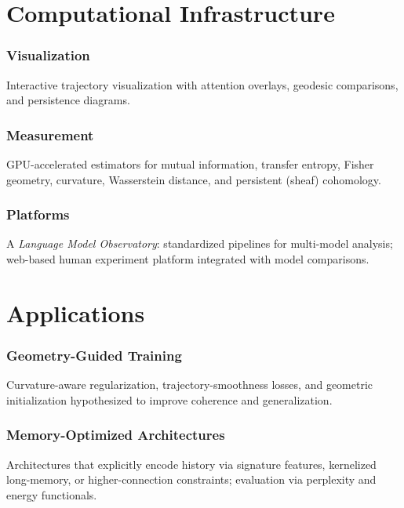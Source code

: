 \documentclass[12pt,a4paper]{article}
\theoremstyle{definition}
\begin{document}
\part{Computational Infrastructure}

\section{Visualization}
Interactive trajectory visualization with attention overlays, geodesic comparisons, and persistence diagrams.

\section{Measurement}
GPU-accelerated estimators for mutual information, transfer entropy, Fisher geometry, curvature, Wasserstein distance, and persistent (sheaf) cohomology.

\section{Platforms}
A \emph{Language Model Observatory}: standardized pipelines for multi-model analysis; web-based human experiment platform integrated with model comparisons.

\part{Applications}

\section{Geometry-Guided Training}
Curvature-aware regularization, trajectory-smoothness losses, and geometric initialization hypothesized to improve coherence and generalization.

\section{Memory-Optimized Architectures}
Architectures that explicitly encode history via signature features, kernelized long-memory, or higher-connection constraints; evaluation via perplexity and energy functionals.
\end{document}
